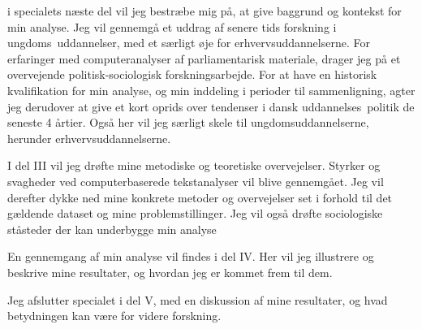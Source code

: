 i specialets næste del vil jeg bestræbe mig på, at give baggrund og kontekst for min analyse.
Jeg vil gennemgå et uddrag af senere tids forskning i ungdoms\ uddannelser, med et særligt øje for erhvervsuddannelserne.
For erfaringer med computeranalyser af parliamentarisk materiale, drager jeg på et overvejende politisk-sociologisk forskningsarbejde.
For at have en historisk kvalifikation for min analyse, og min inddeling i perioder til sammenligning, agter jeg derudover at give et kort oprids over tendenser i dansk uddannelses\ politik de seneste 4 årtier.
Også her vil jeg særligt skele til ungdomsuddannelserne, herunder erhvervsuddannelserne.

I del III vil jeg drøfte mine metodiske og teoretiske overvejelser.
Styrker og svagheder ved computerbaserede tekstanalyser vil blive gennemgået. Jeg vil derefter dykke ned mine konkrete metoder og overvejelser set i forhold til det gældende dataset og mine problemstillinger.
Jeg vil også drøfte sociologiske ståsteder der kan underbygge min analyse 

En gennemgang af min analyse vil findes i del IV.
Her vil jeg illustrere og beskrive mine resultater, og hvordan jeg er kommet frem til dem.

Jeg afslutter specialet i del V, med en diskussion af mine resultater, og hvad betydningen kan være for videre forskning.
